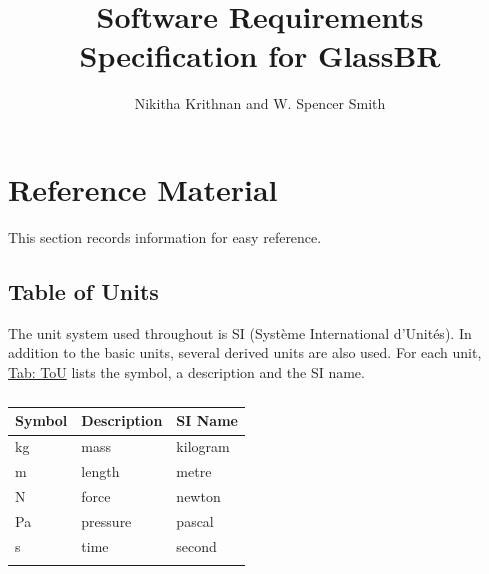 \documentclass[12pt]{article}
\title{Software Requirements Specification for GlassBR}
\author{Nikitha Krithnan and W. Spencer Smith}
\begin{document}
\maketitle
\tableofcontents
\newpage
\section{Reference Material}
\label{Sec:RefMat}
This section records information for easy reference.
\subsection{Table of Units}
\label{Sec:ToU}
The unit system used throughout is SI (Système International d'Unités). In addition to the basic units, several derived units are also used. For each unit, \hyperref[Table:ToU]{Tab: ToU} lists the symbol, a description and the SI name.
\begin{longtable}{l l l}
\toprule
\textbf{Symbol} & \textbf{Description} & \textbf{SI Name}
\\
\midrule
\endhead
kg & mass & kilogram
\\
m & length & metre
\\
N & force & newton
\\
Pa & pressure & pascal
\\
s & time & second
\\
\bottomrule
\caption{}
\label{Table:ToU}
\end{longtable}
\end{document}
